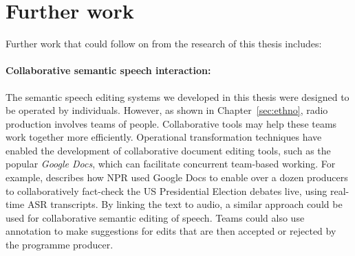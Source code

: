 











\section{Further work}\label{sec:conclusions-further}

Further work that could follow on from the research of this thesis includes:

\paragraph{Collaborative semantic speech interaction:}

The semantic speech editing systems we developed in this thesis were designed to be operated by individuals.
However, as shown in Chapter~\ref{sec:ethno}, radio production involves teams of people.  Collaborative tools may help
these teams work together more efficiently.  Operational transformation techniques \citep{Sun2004} have enabled the
development of collaborative document editing tools, such as the popular \textit{Google Docs}, which can facilitate
concurrent team-based working.  For example, \citet{Fisher2016} describes how NPR used Google Docs to enable over a
dozen producers to collaboratively fact-check the US Presidential Election debates live, using real-time ASR
transcripts. By linking the text to audio, a similar approach could be used for collaborative semantic editing of
speech. Teams could also use annotation to make suggestions for edits that are then accepted or rejected by the
programme producer.


